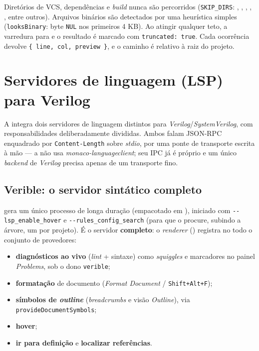 Diretórios de VCS, dependências e \textit{build} nunca são percorridos
(\lstinline|SKIP_DIRS|: , , ,
, ,  entre outros). Arquivos binários
são detectados por uma heurística simples (\lstinline|looksBinary|: byte
\texttt{NUL} nos primeiros 4 KB). Ao atingir qualquer teto, a varredura para e o
resultado é marcado com \lstinline|truncated: true|. Cada ocorrência devolve
\lstinline|{ line, col, preview }|, e o caminho é relativo à raiz do projeto.

\section{Servidores de linguagem (LSP) para Verilog}
\label{sec:13-lsp}

A  integra dois servidores de linguagem distintos para
\textit{Verilog}/\textit{SystemVerilog}, com responsabilidades deliberadamente
divididas. Ambos falam JSON-RPC enquadrado por \lstinline|Content-Length| sobre
\textit{stdio}, por uma ponte de transporte escrita à mão — a  não
usa \textit{monaco-languageclient}; seu IPC já é próprio e um único \textit{backend}
de \textit{Verilog} precisa apenas de um transporte fino.

\subsection{Verible: o servidor sintático completo}

 gera um único processo de longa duração
 (empacotado em
), iniciado com
\lstinline|--lsp_enable_hover| e \lstinline|--rules_config_search| (para que o
 procure, subindo a árvore, um  por
projeto). É o servidor \textbf{completo}: o \textit{renderer}
() registra no  todo o conjunto
de provedores:

\begin{itemize}[leftmargin=*]
  \item \textbf{diagnósticos ao vivo} (\textit{lint} + sintaxe) como
        \textit{squiggles} e marcadores no painel \textit{Problems}, sob o dono
        \lstinline|verible|;
  \item \textbf{formatação} de documento (\textit{Format Document} /
        \lstinline|Shift+Alt+F|);
  \item \textbf{símbolos de \textit{outline}} (\textit{breadcrumbs} e visão
        \textit{Outline}), via \lstinline|provideDocumentSymbols|;
  \item \textbf{hover};
  \item \textbf{ir para definição} e \textbf{localizar referências}.
\end{itemize}

